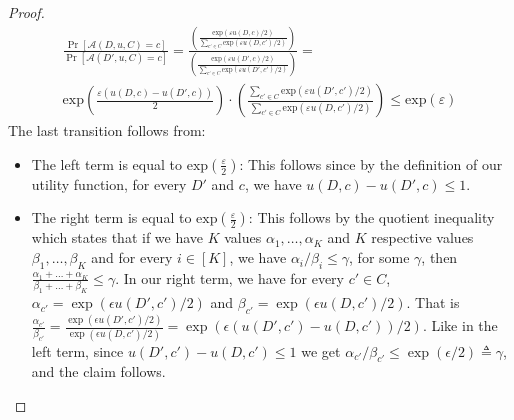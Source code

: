 \begin{proof}
\begin{multline*}
\frac{\Pr[\mathcal{A}(D,u, C) = c]}{\Pr[\mathcal{A}(D',u,C) = c]}=\frac{\left( \frac{\text{exp}(\varepsilon u(D,c)/2)}{\sum_{c'\in C} \text{exp}(\varepsilon u(D,c')/2)} \right) }{\left( \frac{\text{exp}(\varepsilon u(D',c)/2)}{\sum_{c'\in C} \text{exp}(\varepsilon u(D',c')/2)} \right) }=\\ 
\text{exp}\left(\frac{\varepsilon(u(D,c)-u(D',c))}{2}\right)\cdot\left(\frac{\sum_{c'\in C} \text{exp}(\varepsilon u(D',c')/2)}{\sum_{c'\in C} \text{exp}(\varepsilon u(D,c')/2)}\right)
\leq %
\text{exp}(\varepsilon)
\end{multline*}
The last transition follows from:
\begin{itemize}[nosep,nolistsep]
  \item The left term is equal to $\text{exp}\left(\frac{\varepsilon}{2}\right)$: This follows since by the definition of our utility function, for every $D'$ and $c$, we have $u(D,c)-u(D',c) \leq 1$.
\item The right term is equal to  $\text{exp}\left(\frac{\varepsilon}{2}\right)$: This follows by 
the quotient inequality which states that if we have $K$ values $\alpha_1,\ldots,\alpha_K$ and $K$ respective values $\beta_1,\ldots,\beta_K$ and for every $i\in[K]$, we have $\alpha_i / \beta_i \leq \gamma$, for some $\gamma$, then
$\frac{\alpha_1+\ldots + \alpha_K} {\beta_1+\ldots+\beta_K} \leq \gamma$. In our right term, we have for every $c'\in C$,  $\alpha_{c'}=\exp(\epsilon u(D',c')/2)$ and $\beta_{c'}= \exp(\epsilon u(D,c')/2)$. 
That is  $\frac{\alpha_{c'}}{\beta_{c'}} = \frac{\exp(\epsilon u(D',c')/2)}{\exp(\epsilon u(D,c')/2)}=
 \exp(\epsilon (u(D',c')- u(D,c'))/2)$. Like in the left term, since  $u(D',c')-u(D,c') \leq 1$
 we get $\alpha_{c'}/\beta_{c'} \leq \exp(\epsilon/2)\triangleq \gamma$, and the claim follows. 
\end{itemize}
 \end{proof}

